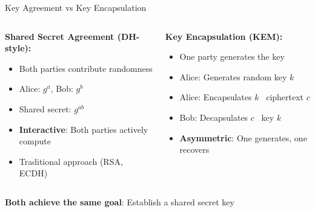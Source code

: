 \documentclass[aspectratio=169, lualatex, handout]{beamer}
\begin{document}
\begin{frame}{Key Agreement vs Key Encapsulation}
	\begin{columns}[c]
		\begin{column}{0.5\textwidth}
			\textbf{Shared Secret Agreement (DH-style):}
			\begin{itemize}
				\item Both parties contribute randomness
				\item Alice: $g^a$, Bob: $g^b$
				\item Shared secret: $g^{ab}$
				\item \textbf{Interactive}: Both parties actively compute
				\item Traditional approach (RSA, ECDH)
			\end{itemize}
		\end{column}
		\begin{column}{0.5\textwidth}
			\textbf{Key Encapsulation (KEM):}
			\begin{itemize}
				\item One party generates the key
				\item Alice: Generates random key $k$
				\item Alice: Encapsulates $k$ \rightarrow\ ciphertext $c$
				\item Bob: Decapsulates $c$ \rightarrow\ key $k$
				\item \textbf{Asymmetric}: One generates, one recovers
			\end{itemize}
		\end{column}
	\end{columns}
	\vspace{5mm}
	\begin{center}
		\textbf{Both achieve the same goal}: Establish a shared secret key
	\end{center}
\end{frame}
\end{document}
